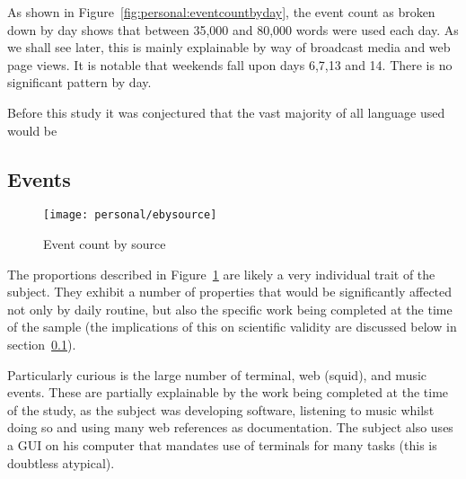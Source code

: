 As shown in Figure~\ref{fig:personal:eventcountbyday}, the event count as broken down by day shows that between 35,000 and 80,000 words were used each day.  As we shall see later, this is mainly explainable by way of broadcast media and web page views.  It is notable that weekends fall upon days 6,7,13 and 14.  There is no significant pattern by day.

Before this study it was conjectured that the vast majority of all language used would be 








\subsection{Events}

\begin{figure}[hp]
    \centering
    \texttt{[image: personal/ebysource]}
    \caption{Event count by source}
    \label{fig:personal:eventsbysource}
\end{figure}

The proportions described in Figure~\ref{fig:personal:eventsbysource} are likely a very individual trait of the subject.  They exhibit a number of properties that would be significantly affected not only by daily routine, but also the specific work being completed at the time of the sample (the implications of this on scientific validity are discussed below in section~\ref{}).

Particularly curious is the large number of terminal, web (squid), and music events.  These are partially explainable by the work being completed at the time of the study, as the subject was developing software, listening to music whilst doing so and using many web references as documentation.  The subject also uses a GUI on his computer that mandates use of terminals for many tasks (this is doubtless atypical).



